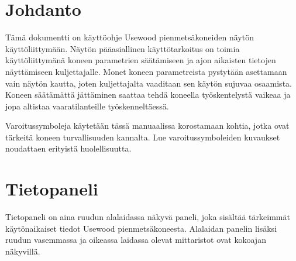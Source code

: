 \documentclass[12pt,a4paper,finnish]{uvmanual}
\begin{document}
\if@twoside
\clearpage
\fi

\setcounter{page}{0} %







\renewcommand\contentsname{Sisällysluettelo}         %
\setcounter{tocdepth}{2}                      %
\tableofcontents                              %

\cleardoublepage

\newpage             %
\setcounter{page}{1} %
\renewcommand{\chaptername}{} %

\chapter{Johdanto}

Tämä dokumentti on käyttöohje Usewood pienmetsäkoneiden näytön käyttöliittymään. Näytön pääasiallinen käyttötarkoitus on toimia käyttöliittymänä koneen parametrien säätämiseen ja ajon aikaisten tietojen näyttämiseen kuljettajalle. Monet koneen parametreista pystytään asettamaan vain näytön kautta, joten kuljettajalta vaaditaan sen käytön sujuvaa osaamista. Koneen säätämättä jättäminen saattaa tehdä koneella työskentelystä vaikeaa ja jopa altistaa vaaratilanteille työskenneltäessä.

{Varoitussymboleja käytetään tässä manuaalissa korostamaan kohtia, jotka ovat tärkeitä koneen turvallisuuden kannalta. Lue varoitussymboleiden kuvaukset noudattaen erityistä huolellisuutta.}

\chapter{Tietopaneli}\label{ch:taskbar}
Tietopaneli on aina ruudun alalaidassa näkyvä paneli, joka sisältää tärkeimmät käytönaikaiset tiedot Usewood pienmetsäkoneesta. Alalaidan panelin lisäksi ruudun vasemmassa ja oikeassa laidassa olevat mittaristot ovat kokoajan näkyvillä.
\end{document}
